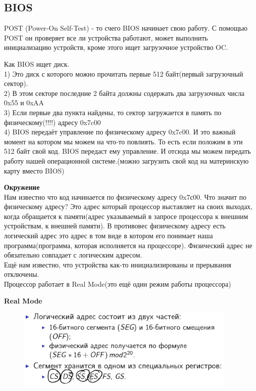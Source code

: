	\subsection{BIOS}
	\par POST (Power-On Self-Test) - то счего BIOS начинает свою работу. С помощью POST он проверяет все ли устройства работают, может выполнить инициализацию устройств, кроме этого ищет загрузочное устройство OC.
	\par Как BIOS ищет диск.
	\\1) Это диск с которого можно прочитать первые 512 байт(первый загрузочный сектор).
	\\2) В этом секторе последние 2 байта должны содержать два загрузочных числа 0x55 и 0xAA
	\\3) Если первые два пункта найдены, то сектор загружается в память по физическому(!!!!) адресу 0x7c00
	\\4) BIOS передаёт управление по физическому адресу 0x7c00. И это важный момент на котором мы можем на что-то повлиять. То есть если положим в эти 512 байт свой код. BIOS передаст ему управление. И отсюда мы можем передать работу нашей операционной системе.(можно загрузить свой код на материнскую карту вместо BIOS)
	\\
	\par \textbf{Окружение}
	\\ Нам известно что код начинается по физическому адресу 0x7с00. Что значит по физическому адресу? Это адрес который процессор выставляет на своих выходах, когда обращается к памяти(адрес указываемый в запросе процессора к внешним устройствам, к внешней памяти). В противовес физическому адресу есть логический адрес это адрес в том виде в котором его понимает наша программа(программа, которая исполняется на процессоре). Физический адрес не обязательно совпадает с логическим адресом.
	\\Ещё нам известно, что устройства как-то инициализированы и прерывания отключены.
	\\Процессор работает в Real Mode(это ещё один режим работы процессора)
	\\
	\par \textbf{Real Mode}
	
	\begin{figure}[h]
		\centering
		\includegraphics[height=4cm]{img/3.4} 
		\captionsetup{font=footnotesize} 
		\caption*{} 
	\end{figure}
	
